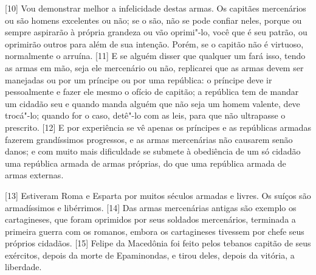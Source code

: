 {[}10{]} Vou demonstrar melhor a infelicidade destas armas. Os capitães
mercenários ou são homens excelentes ou não; se o são, não se pode
confiar neles, porque ou sempre aspirarão à própria grandeza ou vão
oprimi"-lo, você que é seu patrão, ou oprimirão outros para além de sua
intenção. Porém, se o capitão não é virtuoso, normalmente o arruína.
{[}11{]} E se alguém disser que qualquer um fará isso, tendo as armas em
mão, seja ele mercenário ou não, replicarei que as armas devem ser
manejadas ou por um príncipe ou por uma república: o príncipe deve ir
pessoalmente e fazer ele mesmo o ofício de capitão; a república tem de
mandar um cidadão seu e quando manda alguém que não seja um homem
valente, deve trocá"-lo; quando for o caso, detê"-lo com as leis, para que
não ultrapasse o prescrito. {[}12{]} E por experiência se vê apenas os
príncipes e as repúblicas armadas fazerem grandíssimos progressos, e as
armas mercenárias não causarem senão danos; e com muito mais dificuldade
se submete à obediência de um só cidadão uma república armada de armas
próprias, do que uma república armada de armas externas.

{[}13{]} Estiveram Roma e Esparta por muitos séculos armadas e livres.
Os suíços são armadíssimos e libérrimos. {[}14{]} Das armas mercenárias
antigas são exemplo os cartagineses, que foram oprimidos por seus
soldados mercenários, terminada a primeira guerra com os
romanos, embora os
cartagineses tivessem por chefe seus próprios cidadãos. {[}15{]} Felipe
da Macedônia foi feito pelos tebanos capitão de seus
exércitos, depois da morte de Epaminondas, e tirou deles, depois da
vitória, a liberdade.

